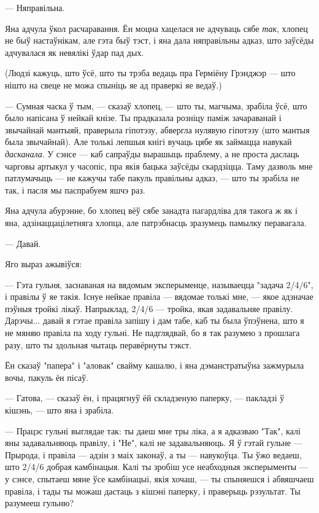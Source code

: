 --- Няправільна.

Яна адчула ўкол расчаравання. Ён моцна хацелася не адчуваць сябе \emph{так}, хлопец
не быў настаўнікам, але гэта быў тэст, і яна дала няправільны адказ, што 
заўсёды адчувалася як невялікі ўдар пад дых.

(Людзі кажуць, што ўсё, што ты трэба ведаць пра Герміёну Грэнджэр --- што нішто на 
свеце не можа спыніць яе ад праверкі яе ведаў.)

--- Сумная часка ў тым, --- сказаў хлопец, --- што ты, магчыма, зрабіла ўсё, што 
было напісана ў нейкай кнізе. Ты прадказала розніцу паміж зачараванай і звычайнай 
мантыяй, праверыла гіпотэзу, абвергла нулявую гіпотэзу (што мантыя была звычайнай).
Але толькі лепшыя кнігі вучаць цябе як займацца навукай \emph{дасканала}. У сэнсе ---
каб сапраўды вырашыць праблему, а не проста даслаць чарговы артыкул у часопіс,
пра якія бацька заўсёды скардзіцца. Таму дазволь мне патлумачыць --- не кажучы
табе пакуль правільны адказ, --- што ты зрабіла не так, і пасля мы паспрабуем яшчэ раз.

Яна адчула абурэнне, бо хлопец вёў сябе занадта пагардліва для такога ж як і яна,
адзінаццацілетняга хлопца, але патрэбнасць зразумець памылку перавагала.

--- Давай.

Яго выраз ажывіўся:

--- Гэта гульня, заснаваная на вядомым эксперыменце, называецца "задача 2/4/6", і
правілы ў яе такія. Існуе нейкае правіла --- вядомае толькі мне, --- якое 
адзначае пэўныя тройкі лікаў. Напрыклад, 2/4/6 --- тройка, якая задавальняе правілу.
Дарэчы... давай я гэтае правіла запішу і дам табе, каб ты была ўпэўнена, што я не
мяняю правіла па ходу гульні. Не падглядвай, бо я так разумею з прошлага разу, што ты здольная чытаць
перавёрнуты тэкст. 

Ён сказаў "папера" і "аловак" свайму кашалю, і яна дэманстратыўна зажмурыла вочы,
пакуль ён пісаў.

--- Гатова, --- сказаў ён, і працягнуў ёй складзеную паперку, --- пакладзі ў 
кішэнь, --- што яна і зрабіла.

--- Працэс гульні выглядае так: ты даеш мне тры ліка, а я адказваю "Так", калі 
яны задавальняюць правілу, і "Не", калі не задавальняюць. Я ў гэтай гульне ---
Прырода, і правіла --- адзін з маіх законаў, а ты --- навукоўца. Ты ўжо ведаеш, што
2/4/6 добрая камбінацыя. Калі ты зробіш усе неабходныя эксперыменты --- у сэнсе,
спытаеш мяне ўсе камбінацыі, якія хочаш, --- ты спыняешся і абвяшчаеш правіла,
і тады ты можаш дастаць з кішэні паперку, і праверыць рэзультат. Ты разумееш гульню?

